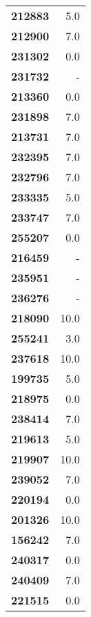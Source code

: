\documentclass[11pt]{article}
\begin{document}
\begin{center}
\begin{longtable}{lr}
\bottomrule
\endlastfoot
\textbf{212883} &                        5.0 \\
\textbf{212900} &                        7.0 \\
\textbf{231302} &                        0.0 \\
\textbf{231732} &                          - \\
\textbf{213360} &                        0.0 \\
\textbf{231898} &                        7.0 \\
\textbf{213731} &                        7.0 \\
\textbf{232395} &                        7.0 \\
\textbf{232796} &                        7.0 \\
\textbf{233335} &                        5.0 \\
\textbf{233747} &                        7.0 \\
\textbf{255207} &                        0.0 \\
\textbf{216459} &                          - \\
\textbf{235951} &                          - \\
\textbf{236276} &                          - \\
\textbf{218090} &                       10.0 \\
\textbf{255241} &                        3.0 \\
\textbf{237618} &                       10.0 \\
\textbf{199735} &                        5.0 \\
\textbf{218975} &                        0.0 \\
\textbf{238414} &                        7.0 \\
\textbf{219613} &                        5.0 \\
\textbf{219907} &                       10.0 \\
\textbf{239052} &                        7.0 \\
\textbf{220194} &                        0.0 \\
\textbf{201326} &                       10.0 \\
\textbf{156242} &                        7.0 \\
\textbf{240317} &                        0.0 \\
\textbf{240409} &                        7.0 \\
\textbf{221515} &                        0.0 \\

\end{longtable}
\end{center}
\end{document}
